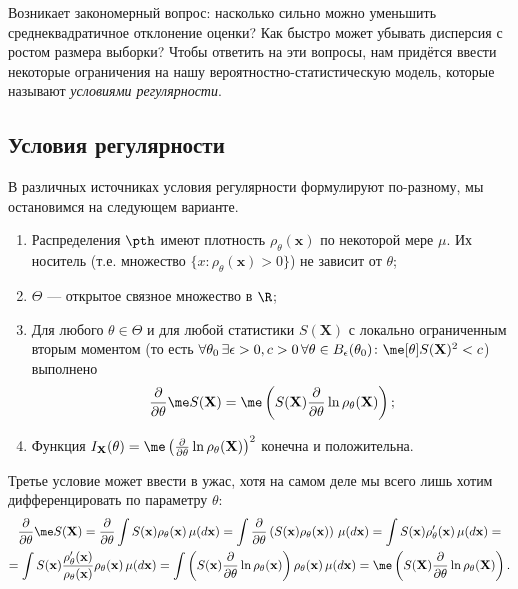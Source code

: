 Возникает закономерный вопрос: насколько сильно можно уменьшить среднеквадратичное отклонение оценки? Как быстро может убывать дисперсия с ростом размера выборки? Чтобы ответить на эти вопросы, нам придётся ввести некоторые ограничения на нашу вероятностно-статистическую модель, которые называют \textit{условиями регулярности}.

\subsection{Условия регулярности}

В различных источниках условия регулярности формулируют по-разному, мы остановимся на следующем варианте.

\begin{regularity*}{}
\begin{enumerate}[label=C\arabic*]
\item\label{same_supp} Распределения $\pth$ имеют плотность $\rho_{\theta}(\mathbf{x})$ по некоторой мере $\mu$. Их носитель (т.е. множество $\{x \colon \rho_{\theta}(\mathbf{x}) > 0\}$) не зависит от $\theta$;\\
\item\label{Theta_is_good} $\Theta$ --- открытое связное множество в $\R$;\\
\item\label{diff_by_theta} Для любого $\theta \in \Theta$ и для любой статистики $S(\mathbf X)$ с локально ограниченным вторым моментом (то есть $\forall \theta_0 \, \exists \epsilon > 0, c > 0 \, \forall \theta \in B_{\epsilon}(\theta_0)\colon \me[\theta]S(\mathbf X)^2 < c$) выполнено
\[
\frac{\partial}{\partial\theta} \me S(\mathbf X) = \me \left(S(\mathbf X)\frac{\partial}{\partial\theta}\ln{\rho_{\theta}(\mathbf X)}\right);
\]
\item\label{fisher_inf} Функция $I_{\mathbf X}(\theta) = \me \left(\frac{\partial}{\partial\theta}\ln{\rho_{\theta}(\mathbf X)}\right)^2$ конечна и положительна.
\end{enumerate}
\end{regularity*}

Третье условие может ввести в ужас, хотя на самом деле мы всего лишь хотим дифференцировать по параметру $\theta$:
\begin{gather*}
\frac{\partial}{\partial\theta} \me S(\mathbf X) = \frac{\partial}{\partial\theta} \int S(\mathbf x) \rho_{\theta}(\mathbf x)\,\mu(d\mathbf{x}) = \int \frac{\partial}{\partial\theta}\left(S(\mathbf x) \rho_{\theta}(\mathbf x)\right)\,\mu(d\mathbf{x}) = \int S(\mathbf x) \rho'_{\theta}(\mathbf x)\,\mu(d\mathbf{x}) = \\
= \int S(\mathbf x) \frac{\rho'_{\theta}(\mathbf x)}{\rho_{\theta}(\mathbf x)} \rho_{\theta}(\mathbf x)\,\mu(d\mathbf{x}) = \int \left(S(\mathbf x) \frac{\partial}{\partial \theta}\ln{\rho_{\theta}(\mathbf x)}\right) \rho_{\theta}(\mathbf x)\,\mu(d\mathbf{x}) = \me \left(S(\mathbf X)\frac{\partial}{\partial\theta}\ln{\rho_{\theta}(\mathbf X)}\right).
\end{gather*}

